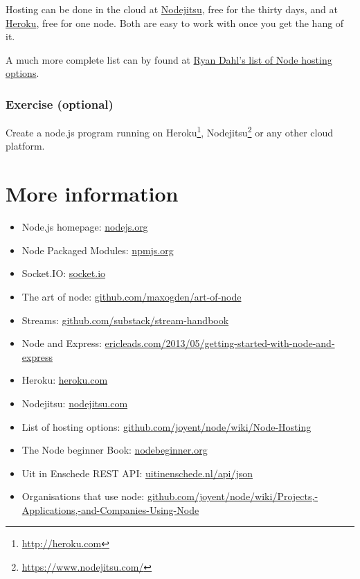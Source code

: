 \documentclass[a4paper]{report}
\begin{document}
Hosting can be done in the cloud at \href{https://www.nodejitsu.com/}{Nodejitsu}, free for the thirty days, and at \href{https://www.heroku.com/}{Heroku}, free for one node. Both are easy to work with once you get the hang of it.

A much more complete list can by found at \href{https://github.com/joyent/node/wiki/Node-Hosting}{Ryan Dahl's list of Node hosting options}.

\subsubsection*{Exercise (optional)}
Create a node.js program running on Heroku\footnote{\url{http://heroku.com}}, Nodejitsu\footnote{\url{https://www.nodejitsu.com/}} or any other cloud platform.

\section*{More information}
\begin{itemize}
	\item Node.js homepage: \href{http://nodejs.org}{nodejs.org}
	\item Node Packaged Modules: \href{https://npmjs.org/}{npmjs.org}
	\item Socket.IO: \href{http://socket.io/}{socket.io}
	\item The art of node: \href{https://github.com/maxogden/art-of-node}{github.com/maxogden/art-of-node}
	\item Streams: \href{https://github.com/substack/stream-handbook}{github.com/substack/stream-handbook}
	\item Node and Express: \href{http://ericleads.com/2013/05/getting-started-with-node-and-express/}{ericleads.com/2013/05/getting-started-with-node-and-express}
	\item Heroku: \href{https://www.heroku.com/}{heroku.com}
	\item Nodejitsu: \href{https://www.nodejitsu.com/}{nodejitsu.com}
	\item List of hosting options: \href{https://github.com/joyent/node/wiki/Node-Hosting}{github.com/joyent/node/wiki/Node-Hosting}
	\item The Node beginner Book: \href{http://www.nodebeginner.org/}{nodebeginner.org}
	\item Uit in Enschede REST API: \href{http://www.uitinenschede.nl/api/json/?page=index}{uitinenschede.nl/api/json}
	\item Organisations that use node: \href{https://github.com/joyent/node/wiki/Projects,-Applications,-and-Companies-Using-Node}{github.com/joyent/node/wiki/Projects,-Applications,-and-Companies-Using-Node}
\end{itemize}

\end{document}
